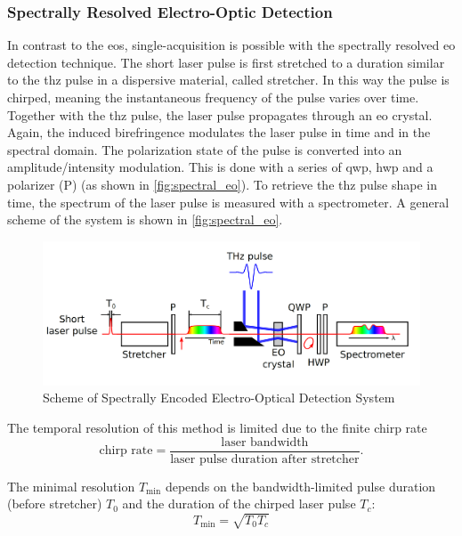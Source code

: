 \subsubsection*{Spectrally Resolved Electro-Optic Detection}
In contrast to the \gls{eos}, single-acquisition is possible with the spectrally resolved \gls{eo} detection technique.
The short laser pulse is first stretched to a duration similar to the \gls{thz} pulse in a dispersive material, called stretcher.
In this way the pulse is chirped, meaning the instantaneous frequency of the pulse varies over time.
Together with the \gls{thz} pulse, the laser pulse propagates through an \gls{eo} crystal.
Again, the induced birefringence modulates the laser pulse in time and in the spectral domain. 
The polarization state of the pulse is converted into an amplitude/intensity modulation.
This is done with a series of \gls{qwp}, \gls{hwp} and a polarizer (P) (as shown in \autoref{fig:spectral_eo}).
To retrieve the \gls{thz} pulse shape in time, the spectrum of the laser pulse is measured with a spectrometer. %
A general scheme of the system is shown in \autoref{fig:spectral_eo}. \cite{roussel2014}

\begin{figure}[tb]
	\centering
	\includegraphics{chap/02-theory/img/bd/spectral_eo}
	\caption{Scheme of Spectrally Encoded Electro-Optical Detection System \cite{roussel2014}}
	\label{fig:spectral_eo}
\end{figure}

The temporal resolution of this method is limited due to the finite chirp rate
\begin{equation}
	\text{chirp rate} = \frac{\text{laser bandwidth}}{\text{laser pulse duration after stretcher}}.
\end{equation}

The minimal resolution $T_{\text{min}}$ depends on the bandwidth-limited pulse duration (before stretcher) $T_0$ and the duration of the chirped laser pulse $T_c$:
\begin{equation}
	T_{\text{min}} = \sqrt{T_0 T_c}
\end{equation}


